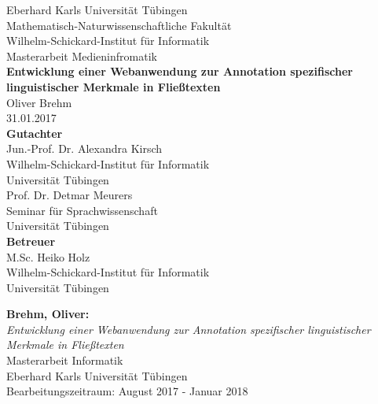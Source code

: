\documentclass[twoside,12pt,a4paper]{scrreprt}
\begin{document}
\begin{titlepage}
\begin{center}
\LARGE Eberhard Karls Universität Tübingen\\
\large Mathematisch-Naturwissenschaftliche Fakultät \\
Wilhelm-Schickard-Institut für Informatik\\
[3cm]
\huge Masterarbeit Medieninfromatik\\
[2cm]
\Large\textbf{Entwicklung einer Webanwendung zur Annotation spezifischer linguistischer Merkmale in Fließtexten}\\
[1.5cm]
\large Oliver Brehm\\
[0.5cm]
31.01.2017\\
\vfill
\small\textbf{Gutachter}\\[0.3cm]

\large Jun.-Prof. Dr. Alexandra Kirsch\\
\footnotesize Wilhelm-Schickard-Institut für Informatik\\Universität Tübingen\\
[0.5cm]

\large Prof. Dr. Detmar Meurers\\
\footnotesize Seminar für Sprachwissenschaft\\Universität Tübingen\\
[1cm]

\small\textbf{Betreuer}\\[0.3cm]
\large M.Sc. Heiko Holz\\
\footnotesize Wilhelm-Schickard-Institut für Informatik\\Universität Tübingen
\end{center}
\end{titlepage}

\thispagestyle{empty}
\vspace*{\fill}
\textbf{Brehm, Oliver:}\\
\emph{Entwicklung einer Webanwendung zur Annotation spezifischer linguistischer Merkmale in Fließtexten}\\
Masterarbeit Informatik\\
Eberhard Karls Universität Tübingen\\
Bearbeitungszeitraum: August 2017 - Januar 2018
\newpage


\newpage

\tableofcontents\label{toc}
\listoffigures
\listoftables
\cleardoublepage
\end{document}
